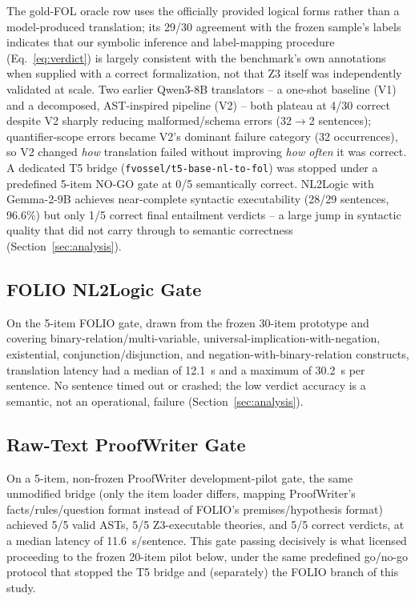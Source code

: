 \documentclass[conference]{IEEEtran}
\begin{document}
The gold-FOL oracle row uses the officially provided logical forms rather than a model-produced translation; its 29/30 agreement with the frozen sample's labels indicates that our symbolic inference and label-mapping procedure (Eq.~\eqref{eq:verdict}) is largely consistent with the benchmark's own annotations when supplied with a correct formalization, not that Z3 itself was independently validated at scale. Two earlier Qwen3-8B translators -- a one-shot baseline (V1) and a decomposed, AST-inspired pipeline (V2) -- both plateau at 4/30 correct despite V2 sharply reducing malformed/schema errors (32$\to$2 sentences); quantifier-scope errors became V2's dominant failure category (32 occurrences), so V2 changed \emph{how} translation failed without improving \emph{how often} it was correct. A dedicated T5 bridge (\texttt{fvossel/t5-base-nl-to-fol}) was stopped under a predefined 5-item NO-GO gate at 0/5 semantically correct. NL2Logic with Gemma-2-9B achieves near-complete syntactic executability (28/29 sentences, 96.6\%) but only 1/5 correct final entailment verdicts -- a large jump in syntactic quality that did not carry through to semantic correctness (Section~\ref{sec:analysis}).

\subsection{FOLIO NL2Logic Gate}
On the 5-item FOLIO gate, drawn from the frozen 30-item prototype and covering binary-relation/multi-variable, universal-implication-with-negation, existential, conjunction/disjunction, and negation-with-binary-relation constructs, translation latency had a median of 12.1~s and a maximum of 30.2~s per sentence. No sentence timed out or crashed; the low verdict accuracy is a semantic, not an operational, failure (Section~\ref{sec:analysis}).

\subsection{Raw-Text ProofWriter Gate}
On a 5-item, non-frozen ProofWriter development-pilot gate, the same unmodified bridge (only the item loader differs, mapping ProofWriter's facts/rules/question format instead of FOLIO's premises/hypothesis format) achieved 5/5 valid ASTs, 5/5 Z3-executable theories, and 5/5 correct verdicts, at a median latency of 11.6~s/sentence. This gate passing decisively is what licensed proceeding to the frozen 20-item pilot below, under the same predefined go/no-go protocol that stopped the T5 bridge and (separately) the FOLIO branch of this study.
\end{document}
